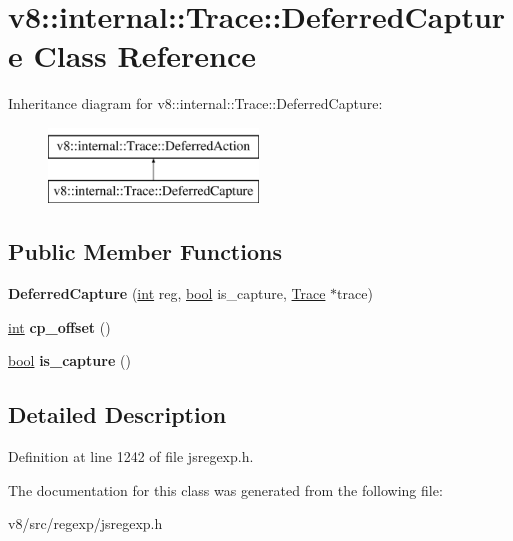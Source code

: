 \hypertarget{classv8_1_1internal_1_1Trace_1_1DeferredCapture}{}\section{v8\+:\+:internal\+:\+:Trace\+:\+:Deferred\+Capture Class Reference}
\label{classv8_1_1internal_1_1Trace_1_1DeferredCapture}
Inheritance diagram for v8\+:\+:internal\+:\+:Trace\+:\+:Deferred\+Capture\+:\begin{figure}[H]
\begin{center}
\leavevmode
\includegraphics[height=2.000000cm]{classv8_1_1internal_1_1Trace_1_1DeferredCapture}
\end{center}
\end{figure}
\subsection*{Public Member Functions}
\begin{DoxyCompactItemize}
\item 
\mbox{\label{classv8_1_1internal_1_1Trace_1_1DeferredCapture_a20de459c31ae73a99b96e89a0364337f}} 
{\bfseries Deferred\+Capture} (\mbox{\hyperlink{classint}{int}} reg, \mbox{\hyperlink{classbool}{bool}} is\+\_\+capture, \mbox{\hyperlink{classv8_1_1internal_1_1Trace}{Trace}} $\ast$trace)
\item 
\mbox{\label{classv8_1_1internal_1_1Trace_1_1DeferredCapture_ada13388019075f6a61a6da2cdfb617ad}} 
\mbox{\hyperlink{classint}{int}} {\bfseries cp\+\_\+offset} ()
\item 
\mbox{\label{classv8_1_1internal_1_1Trace_1_1DeferredCapture_aad6bc18b74d133664b9eb67212ec8f0f}} 
\mbox{\hyperlink{classbool}{bool}} {\bfseries is\+\_\+capture} ()
\end{DoxyCompactItemize}


\subsection{Detailed Description}


Definition at line 1242 of file jsregexp.\+h.



The documentation for this class was generated from the following file\+:\begin{DoxyCompactItemize}
\item 
v8/src/regexp/jsregexp.\+h\end{DoxyCompactItemize}

